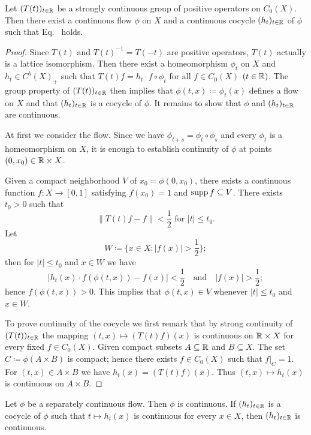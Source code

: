 \begin{proposition}\label{prop:b2-3.9}
Let $(T(t))_{t \in \mathbb{R}}$ be a strongly continuous group of positive operators on $C_0(X)$.
Then there exist a continuous flow $\phi$ on $X$ and a continuous cocycle $(h_t)_{t \in \mathbb{R}}$ of\/ $\phi$ such that Eq.~ holds.
\end{proposition}
\begin{proof}
Since $T(t)$ and $T(t)^{-1} = T(-t)$ are positive operators, $T(t)$ actually is a lattice isomorphism.
Then there exist a homeomorphism $\phi_t$ on $X$ and $h_t \in C^{b}(X)_+$ such that $T(t)f = h_t \cdot f \circ \phi_t$ for all $f \in C_0(X)$ $(t \in \mathbb{R})$.
The group property of\/ $(T(t))_{t \in \mathbb{R}}$ then implies that $\phi(t,x) \coloneq \phi_t(x)$ defines a flow on $X$ and that $(h_t)_{t \in \mathbb{R}}$ is a cocycle of\/ $\phi$.
It remains to show that $\phi$ and $(h_t)_{t \in \mathbb{R}}$ are continuous.

At first we consider the flow.
Since we have $\phi_{t+s} = \phi_t \circ \phi_s$ and every $\phi_t$ is a homeomorphism on $X$, it is enough to establish continuity of\/ $\phi$ at points $(0,x_0) \in \mathbb{R} \times X$.

Given a compact neighborhood $V$ of\/ $x_0 = \phi (0,x_0)$, there exists a continuous function $f \colon X \to [0,1]$ satisfying $f(x_0) = 1$ and $\mathop{}\!\mathrm{supp}\, f \subseteq V$.
There exists $t_0 > 0$ such that 
%
\[
	\|T(t)f - f\| < \frac{1}{2} \text{ for  $|t| \leq t_0$}.
\]
%
Let 
%
\[
	W \coloneq \{x \in X \colon |f(x)| > \frac{1}{2}\};
\]
%
then for $|t| \leq t_0$ and $x \in W$ we have 
%
\[
	|h_t(x) \cdot f(\phi(t,x)) - f(x)| < \frac{1}{2} \quad \text{and} \quad |f(x)| > \frac{1}{2};
\]
%
hence $f(\phi (t,x)) > 0$.
This implies that $\phi (t,x) \in V$ whenever $|t| \leq t_0$ and $x \in W$.

To prove continuity of the cocycle we first remark that by strong continuity of\/ $(T(t))_{t \in \mathbb{R}}$ 
the mapping $(t,x) \mapsto (T(t)f) (x)$ is continuous on $\mathbb{R} \times X$ for every fixed $f \in C_0(X)$.
Given compact subsets $A \subseteq \mathbb{R} $ and $B \subseteq X$.
The set $C \coloneq \phi(A \times B)$ is compact; hence there exists $f \in C_0(X)$ such that $f|_{C} = 1$.
For $(t,x) \in A \times B$ we have $h_t(x) = (T(t)f) (x)$.
Thus $(t,x) \mapsto h_t(x)$ is continuous on $A \times B$.
\end{proof}
\begin{corollary}\label{cor:b2-3.10}
Let $\phi$ be a separately continuous flow.
Then $\phi$ is continuous.
If\/ $(h_t)_{t \in \mathbb{R}}$ is a cocycle of\/ $\phi$ such that $t \mapsto h_t (x)$ is continuous for every $x \in X$, then $(h_t)_{t \in \mathbb{R}}$ is continuous.
\end{corollary}
